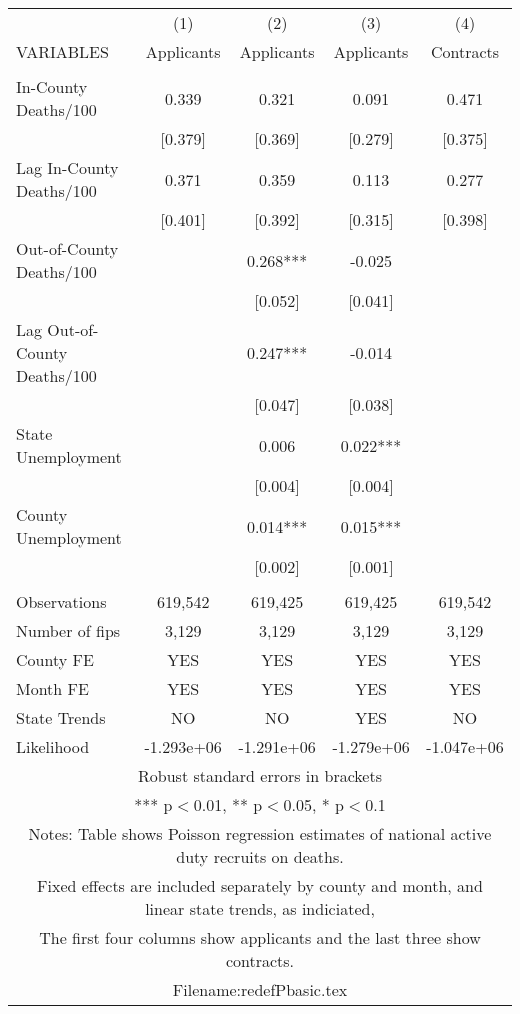 \documentclass[]{article}
\begin{document}
\begin{tabular}{lcccc} \hline
 & (1) & (2) & (3) & (4) \\
VARIABLES & Applicants & Applicants & Applicants & Contracts \\ \hline
 &  &  &  &  \\
In-County Deaths/100 & 0.339 & 0.321 & 0.091 & 0.471 \\
 & [0.379] & [0.369] & [0.279] & [0.375] \\
Lag In-County Deaths/100 & 0.371 & 0.359 & 0.113 & 0.277 \\
 & [0.401] & [0.392] & [0.315] & [0.398] \\
Out-of-County Deaths/100 &  & 0.268*** & -0.025 &  \\
 &  & [0.052] & [0.041] &  \\
Lag Out-of-County Deaths/100 &  & 0.247*** & -0.014 &  \\
 &  & [0.047] & [0.038] &  \\
State Unemployment &  & 0.006 & 0.022*** &  \\
 &  & [0.004] & [0.004] &  \\
County Unemployment &  & 0.014*** & 0.015*** &  \\
 &  & [0.002] & [0.001] &  \\
 &  &  &  &  \\
Observations & 619,542 & 619,425 & 619,425 & 619,542 \\
Number of fips & 3,129 & 3,129 & 3,129 & 3,129 \\
County FE & YES & YES & YES & YES \\
Month FE & YES & YES & YES & YES \\
State Trends & NO & NO & YES & NO \\
 Likelihood & -1.293e+06 & -1.291e+06 & -1.279e+06 & -1.047e+06 \\ \hline
\multicolumn{5}{c}{ Robust standard errors in brackets} \\
\multicolumn{5}{c}{ *** p$<$0.01, ** p$<$0.05, * p$<$0.1} \\
\multicolumn{5}{c}{ Notes: Table shows Poisson regression estimates of national active duty recruits on deaths.} \\
\multicolumn{5}{c}{ Fixed effects are included separately by county and month, and linear state trends, as indiciated,} \\
\multicolumn{5}{c}{ The first four columns show applicants and the last three show contracts.} \\
\multicolumn{5}{c}{ Filename:redefPbasic.tex} \\
\end{tabular}
\end{document}
